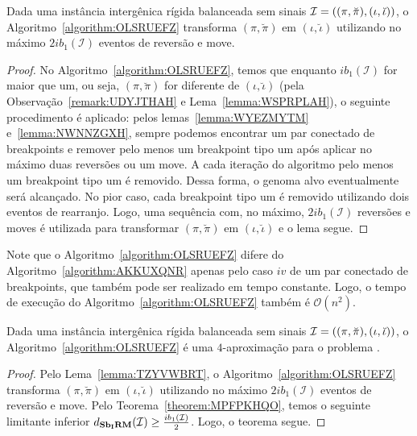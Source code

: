 \begin{lemma}\label{lemma:TZYVWBRT}
Dada uma instância intergênica rígida balanceada sem sinais $\mathcal{I}=((\pi,\breve\pi),\break(\iota,\breve\iota))$, o Algoritmo~\ref{algorithm:OLSRUEFZ} transforma $(\pi,\breve\pi)$ em $(\iota,\breve\iota)$ utilizando no máximo $2ib_1(\mathcal{I})$ eventos de reversão e move.
\end{lemma}
\begin{proof}
  No Algoritmo~\ref{algorithm:OLSRUEFZ}, temos que enquanto $ib_1(\mathcal{I})$ for maior que um, ou seja, $(\pi,\breve\pi)$ for diferente de $(\iota,\breve\iota)$ (pela Observação~\ref{remark:UDYJTHAH} e Lema~\ref{lemma:WSPRPLAH}), o seguinte procedimento é aplicado: pelos lemas~\ref{lemma:WYEZMYTM} e~\ref{lemma:NWNNZGXH}, sempre podemos encontrar um par conectado de breakpoints e remover pelo menos um breakpoint tipo um após aplicar no máximo duas reversões ou um move. A cada iteração do algoritmo pelo menos um breakpoint tipo um é removido. Dessa forma, o genoma alvo eventualmente será alcançado. No pior caso, cada breakpoint tipo um é removido utilizando dois eventos de rearranjo. Logo, uma sequência com, no máximo, $2ib_1(\mathcal{I})$ reversões e moves é utilizada para transformar $(\pi,\breve\pi)$ em $(\iota,\breve\iota)$ e o lema segue.
\end{proof}

Note que o Algoritmo~\ref{algorithm:OLSRUEFZ} difere do Algoritmo~\ref{algorithm:AKKUXQNR} apenas pelo caso $iv$ de um par conectado de breakpoints, que também pode ser realizado em tempo constante. Logo, o tempo de execução do Algoritmo~\ref{algorithm:OLSRUEFZ} também é $\mathcal{O}(n^2)$.

\begin{theorem}\label{theorem:PNTKLAHZ}
Dada uma instância intergênica rígida balanceada sem sinais $\mathcal{I}=\break((\pi,\breve\pi),(\iota,\breve\iota))$, o Algoritmo~\ref{algorithm:OLSRUEFZ} é uma $4$-aproximação para o problema \SbIRM{}.
\end{theorem}
\begin{proof}
Pelo Lema~\ref{lemma:TZYVWBRT}, o Algoritmo~\ref{algorithm:OLSRUEFZ} transforma $(\pi,\breve\pi)$ em $(\iota,\breve\iota)$ utilizando no máximo $2ib_1(\mathcal{I})$ eventos de reversão e move. Pelo Teorema~\ref{theorem:MPFPKHQO}, temos o seguinte limitante inferior $d_{\textbf{Sb\textsubscript{I}RM}}(\mathcal{I}) \ge \frac{ib_1(\mathcal{I})}{2}$. Logo, o teorema segue. 
\end{proof}

